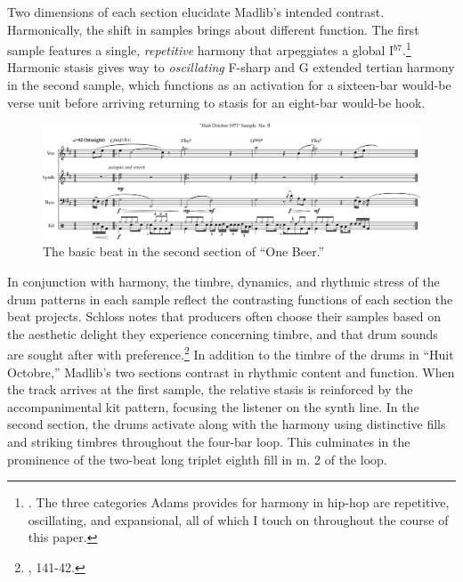 Two dimensions of each section elucidate Madlib's intended contrast. Harmonically, the shift in samples brings about different function. The first sample features a single, \emph{repetitive} harmony that arpeggiates a global I$^{b7}$.\footnote{\cite{kyleadamsHarmonicSyntacticMotivic2020}. The three categories Adams provides for harmony in hip-hop are repetitive, oscillating, and expansional, all of which I touch on throughout the course of this paper.} Harmonic stasis gives way to \emph{oscillating} F-sharp and G extended tertian harmony in the second sample, which functions as an activation for a sixteen-bar would-be verse unit before arriving returning to stasis for an eight-bar would-be hook.

\begin{figure}[h]
    \centering
    \includegraphics[width=\textwidth]{images/figures/chp 02/Figure-02.2-One-Beer-BB-II.pdf}
    \caption{The basic beat in the second section of ``One Beer.''}
    \label{fig:1.3}
\end{figure}

In conjunction with harmony, the timbre, dynamics, and rhythmic stress of the drum patterns in each sample reflect the contrasting functions of each section the beat projects. Schloss notes that producers often choose their samples based on the aesthetic delight they experience concerning timbre, and that drum sounds are sought after with preference.\footnote{\cite{josephgschlossMakingBeatsArt2004}, 141-42.} In addition to the timbre of the drums in ``Huit Octobre,'' Madlib's two sections contrast in rhythmic content and function. When the track arrives at the first sample, the relative stasis is reinforced by the accompanimental kit pattern, focusing the listener on the synth line. In the second section, the drums activate along with the harmony using distinctive fills and striking timbres throughout the four-bar loop. This culminates in the prominence of the two-beat long triplet eighth fill in m. 2 of the loop.

